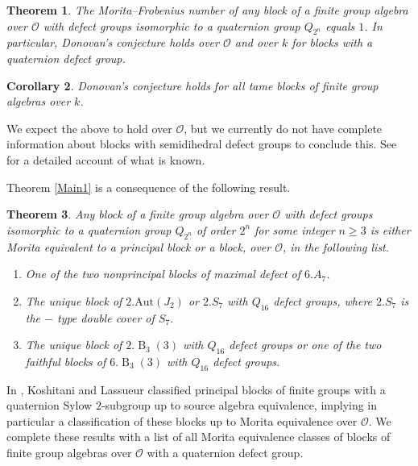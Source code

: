 \documentclass{amsart}
\theoremstyle{plain}\newtheorem{Theorem}{Theorem}[section]
\theoremstyle{plain}\newtheorem{Conjecture}[Theorem]{Conjecture}
\theoremstyle{plain}\newtheorem{Corollary}[Theorem]{Corollary}
\theoremstyle{plain}\newtheorem{Lemma}[Theorem]{Lemma}
\theoremstyle{plain}\newtheorem{Proposition}[Theorem]{Proposition}
\theoremstyle{definition}\newtheorem{Definition}[Theorem]{Definition}
\theoremstyle{definition}\newtheorem{Example}[Theorem]{Example}
\theoremstyle{definition}\newtheorem{Examples}[Theorem]{Examples}
\theoremstyle{definition}\newtheorem{Exercise}[Theorem]{Exercise}
\theoremstyle{definition}\newtheorem{Notation}[Theorem]{Notation}
\theoremstyle{definition}\newtheorem{Remark}[Theorem]{Remark}
\theoremstyle{definition}\newtheorem{Remarks}[Theorem]{Remarks}
\def\CO{{\mathcal{O}}}    \def\OPE{{\mathcal{O}(P\rtimes E)}}
\def\Aut{\mathrm{Aut}}               \def\tenk{\otimes_k}
\newcommand{\type}{\operatorname}
\numberwithin{equation}{section}
\begin{document}
\begin{Theorem}   
The Morita--Frobenius  number of any block of a finite group algebra over $\CO$ with defect groups isomorphic to a quaternion group $Q_{2^n}$ equals $1$. In particular, Donovan's conjecture holds over $\CO$ and over $k$ for blocks with a quaternion defect group. 
\end{Theorem}

\begin{Corollary} 
Donovan's conjecture holds for all tame blocks of finite group algebras over $k$. 
\end{Corollary}

We expect the above  to hold over $\CO$, but we currently do not have complete information 
about blocks with semidihedral defect groups to conclude this. See  for a detailed account of what is known.

Theorem  \ref{Main1}  is  a consequence of the  following result.

\begin{Theorem}   
Any block of a finite group algebra over $\CO$  with defect groups isomorphic to a
quaternion group $Q_{2^n} $ of order $2^n$ for some integer $n\geq 3$
is  either Morita equivalent to a principal  block or a block, over $\CO$, in the  following list.
\begin{enumerate}
\item One of the two nonprincipal blocks of maximal defect of $6.A_7$.
\item  The unique block of $2.\Aut(J_2)$ or $2.S_7$ with $Q_{16}$ defect groups, where $2.S_7$ is the $-$ type double cover of $S_7$.
\item  The unique  block of $2.\type{B}_3(3)$ with $Q_{16}$ defect groups or one of the two  
faithful blocks of $6.\type{B}_3(3)$ with $Q_{16}$ defect groups. 
\end{enumerate}

\end{Theorem}

In \cite{kl20}, Koshitani and Lassueur classified principal blocks of finite groups with  a 
 quaternion Sylow $2$-subgroup up to source algebra equivalence, implying
in particular a classification of these blocks up to Morita equivalence over $\CO$.
We complete these results with a  list of all Morita equivalence classes of blocks of 
finite group algebras over  $\CO$ with a quaternion defect group. 
\end{document}
